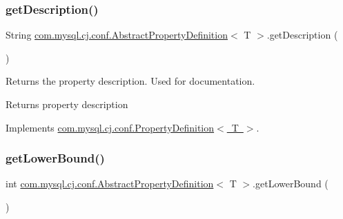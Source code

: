 \mbox{\label{classcom_1_1mysql_1_1cj_1_1conf_1_1_abstract_property_definition_af4a34d8afb26e311ff0f2290d9189bb5}} 
\subsubsection{\texorpdfstring{get\+Description()}{getDescription()}}
{\footnotesize\ttfamily String \mbox{\hyperlink{classcom_1_1mysql_1_1cj_1_1conf_1_1_abstract_property_definition}{com.\+mysql.\+cj.\+conf.\+Abstract\+Property\+Definition}}$<$ T $>$.get\+Description (\begin{DoxyParamCaption}{ }\end{DoxyParamCaption})}

Returns the property description. Used for documentation.

\begin{DoxyReturn}{Returns}
property description 
\end{DoxyReturn}


Implements \mbox{\hyperlink{interfacecom_1_1mysql_1_1cj_1_1conf_1_1_property_definition_a0bdca9976b161458af766cc1e6929cf6}{com.\+mysql.\+cj.\+conf.\+Property\+Definition$<$ T $>$}}.

\mbox{\label{classcom_1_1mysql_1_1cj_1_1conf_1_1_abstract_property_definition_a834649a1010def340ecfda489b8e4c86}} 
\subsubsection{\texorpdfstring{get\+Lower\+Bound()}{getLowerBound()}}
{\footnotesize\ttfamily int \mbox{\hyperlink{classcom_1_1mysql_1_1cj_1_1conf_1_1_abstract_property_definition}{com.\+mysql.\+cj.\+conf.\+Abstract\+Property\+Definition}}$<$ T $>$.get\+Lower\+Bound (\begin{DoxyParamCaption}{ }\end{DoxyParamCaption})}

